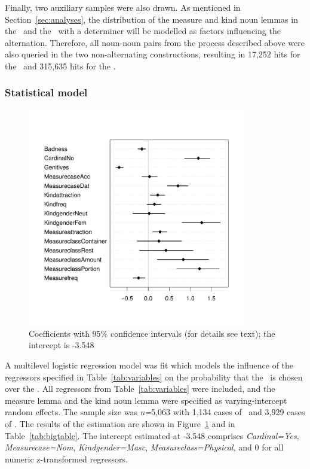 Finally, two auxiliary samples were also drawn.
As mentioned in Section~\ref{sec:analyses}, the distribution of the measure and kind noun lemmas in the \NACb\ and the \PGCd\ with a determiner will be modelled as factors influencing the alternation.
Therefore, all noun-noun pairs from the process described above were also queried in the two non-alternating constructions, resulting in 17,252 hits for the \PGCd\ and 315,635 hits for the \NACb.

\subsubsection{Statistical model}
\label{sec:mainstudystatisticalmodel}

\begin{figure}[hb!]
  \centering
  \includegraphics[width=0.85\textwidth]{../R/output/corpus_fixeffs}
  \caption{Coefficients with 95\% confidence intervals (for details see text); the intercept is -3.548}
  \label{fig:fixeffs}
\end{figure}

A multilevel logistic regression model was fit which models the influence of the regressors specified in Table~\ref{tab:variables} on the probability that the \PGCa\ is chosen over the \NACa.
All regressors from Table~\ref{tab:variables} were included, and the measure lemma and the kind noun lemma were specified as varying-intercept random effects.
The sample size was \textit{n=}5,063 with 1,134 cases of \PGCa\ and 3,929 cases of \NACa.
The results of the estimation are shown in Figure~\ref{fig:fixeffs} and in Table~\ref{tab:bigtable}.
The intercept estimated at -3.548 comprises \textit{Cardinal=Yes}, \textit{Measurecase=Nom}, \textit{Kindgender=Masc}, \textit{Measureclass=Physical}, and 0 for all numeric z-transformed regressors.

